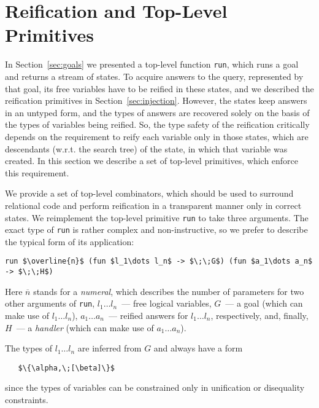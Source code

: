 \section{Reification and Top-Level Primitives}
\label{sec:reification}

In Section~\ref{sec:goals} we presented a top-level function \lstinline{run}, which
runs a goal and returns a stream of states. To acquire answers to the query,
represented by that goal, its free variables have to be reified in these states, and
we described the reification primitives in Section~\ref{sec:injection}. However,
the states keep answers in an untyped form, and the types of answers are
recovered solely on the basis of the types of variables being reified. So, the
type safety of the reification critically depends on the requirement to
reify each variable only in those states, which are descendants (w.r.t. the search tree)
of the state, in which that variable was created. In this section we describe a set of
top-level primitives, which enforce this requirement.

We provide a set of top-level combinators, which should be used to surround relational code
and perform reification in a transparent manner only in correct states.
We reimplement the top-level primitive \lstinline{run} to take three
arguments. The exact type of \lstinline{run} is rather complex and non-instructive,
so we prefer to describe the typical form of its application:

\begin{lstlisting}[mathescape=true]
   run $\overline{n}$ (fun $l_1\dots l_n$ -> $\;\;G$) (fun $a_1\dots a_n$ -> $\;\;H$)
\end{lstlisting}

Here $\overline{n}$ stands for a \emph{numeral}, which describes the number of
parameters for two other arguments of \lstinline{run}, \mbox{$l_1\dots l_n$}~---
free logical variables, $G$~--- a goal (which can make use of \mbox{$l_1\dots l_n$}),
\mbox{$a_1\dots a_n$}~--- reified answers for \mbox{$l_1\dots l_n$}, respectively, and,
finally, $H$~--- a \emph{handler} (which can make use of \mbox{$a_1\dots a_n$}).

The types of \mbox{$l_1\dots l_n$} are inferred from $G$ and always have a form

\begin{lstlisting}
   $\{\alpha,\;[\beta]\}$
\end{lstlisting}

\noindent since the types of variables can be constrained only in unification or disequality constraints.

